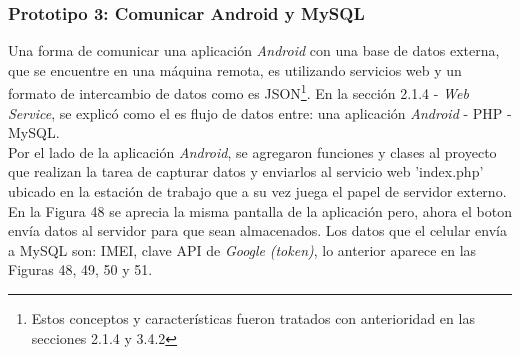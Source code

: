 \subsubsection{Prototipo 3: Comunicar Android y MySQL}

Una forma de comunicar una aplicación \textit{Android} con una base de datos externa, que se encuentre en una máquina remota, es utilizando servicios web y un formato de intercambio de datos como es JSON\footnote{Estos conceptos y características fueron tratados con anterioridad en las secciones 2.1.4 y 3.4.2}. En la sección 2.1.4 - \textit{Web Service}, se explicó como el es flujo de datos entre: una aplicación \textit{Android} - PHP - MySQL.\\

Por el lado de la aplicación \textit{Android}, se agregaron funciones y clases al proyecto que realizan la tarea de capturar datos y enviarlos al servicio web 'index.php' ubicado en la estación de trabajo que a su vez juega el papel de servidor externo. En la Figura 48 se aprecia la misma pantalla de la aplicación pero, ahora el boton envía datos al servidor para que sean almacenados. Los datos que el celular envía a MySQL son: IMEI, clave API de \textit{Google} \textit{(token)}, lo anterior aparece en las Figuras 48, 49, 50 y 51.\\

